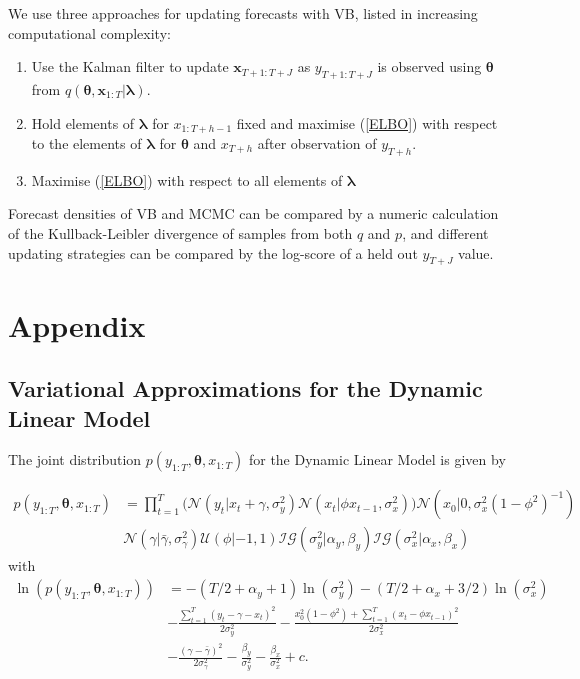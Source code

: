 \documentclass[12pt,a4paper]{article}%
\numberwithin{equation}{section}
\begin{document}
We use three approaches for updating forecasts with VB, listed in increasing computational complexity:
\begin{enumerate}
\item Use the Kalman filter to update $\textbf{x}_{T+1:T+J}$ as $y_{T+1:T+J}$ is observed using $\boldsymbol{\theta}$ from $q(\boldsymbol{\theta}, \textbf{x}_{1:T} | \boldsymbol{\lambda})$.
\item Hold elements of $\boldsymbol{\lambda}$ for $x_{1:T+h-1}$ fixed and maximise (\ref{ELBO}) with respect to the elements of $\boldsymbol{\lambda}$ for $\boldsymbol{\theta}$ and $x_{T+h}$ after observation of $y_{T+h}$.
\item Maximise (\ref{ELBO}) with respect to all elements of $\boldsymbol{\lambda}$
\end{enumerate}

Forecast densities of VB and MCMC can be compared by a numeric calculation of the Kullback-Leibler divergence of samples from both $q$ and $p$, and different updating strategies can be compared by the log-score of a held out $y_{T+J}$ value. 

\section{Appendix}

\subsection{Variational Approximations for the Dynamic Linear Model}

The joint distribution $p(y_{1:T}, \boldsymbol{\theta}, x_{1:T})$ for the Dynamic Linear Model is given by

\begin{align}
p(y_{1:T}, \boldsymbol{\theta}, x_{1:T}) &= \prod_{t=1}^{T} \bigg( \mathcal{N}(y_t | x_t + \gamma, \sigma^2_y) \mathcal{N}(x_t | \phi x_{t-1}, \sigma^2_x) \bigg) \mathcal{N}(x_0 | 0, \sigma^2_x (1 - \phi^2)^{-1}) \nonumber \\
&\mathcal{N}(\gamma | \bar{\gamma}, \sigma^2_{\gamma}) \mathcal{U}(\phi | -1, 1) \mathcal{IG}(\sigma^2_y | \alpha_y, \beta_y)\mathcal{IG}(\sigma^2_x | \alpha_x, \beta_x) 
\end{align}
with 
\begin{align}
\ln(p(y_{1:T}, \boldsymbol{\theta}, x_{1:T})) &= -(T/2 + \alpha_y + 1) \ln(\sigma_y^2) -(T/2 + \alpha_x + 3/2) \ln(\sigma_x^2) \nonumber \\
&- \frac{\sum_{t=1}^{T}(y_t - \gamma - x_t)^2}{2 \sigma^2_y} - \frac{x_0^2(1 -\phi^2) + \sum_{t=1}^{T}(x_t - \phi x_{t-1})^2}{2 \sigma^2_x} \nonumber \\
&- \frac{(\gamma - \bar{\gamma})^2}{2 \sigma^2_{\gamma}} - \frac{\beta_y}{\sigma^2_y} - \frac{\beta_x}{\sigma^2_x} + c \label{logjoint}. 
\end{align}
\end{document}
